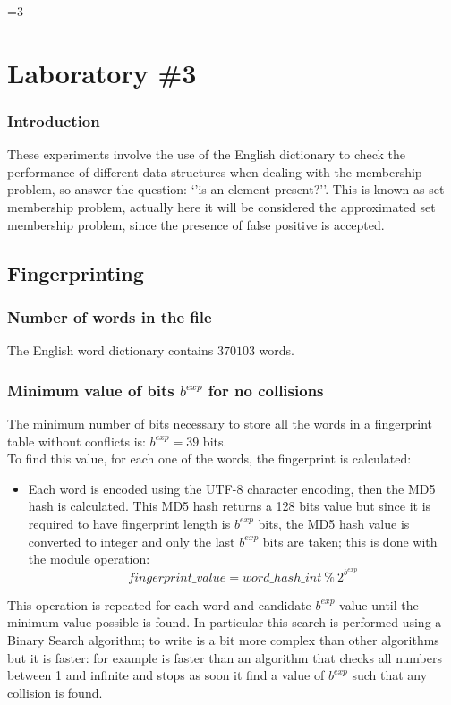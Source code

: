 \documentclass[twocolumn,letterpaper]{report}
\newcounter{debug}
\begin{document}
			
			
\ifnum\value{debug}=3 {

\chapter{Laboratory \#3}
		\subsection*{Introduction} 
				These experiments involve the use of the English dictionary to check the performance of different data structures when dealing with the membership problem, so answer the question: `'is an element present?''. This is known as set membership problem, actually here it will be considered the approximated set membership problem, since the presence of false positive is accepted.
	 
	 \section{Fingerprinting}	 
	 
			 	\subsection{Number of words in the file}
								The English word dictionary contains $370103$ words.
								
			 	\subsection{Minimum value of bits $b^{exp}$ for no collisions}
						The minimum number of bits necessary to store all the words in a fingerprint table without conflicts is: $b^{exp} = 39$ bits. \\
						To find this value, for each one of the words, the fingerprint is calculated:
						\begin{itemize}
								\item[] Each word is encoded using the UTF-8 character encoding, then the MD5 hash is calculated. This MD5 hash returns a 128 bits value but since it is required to have fingerprint length is $b^{exp}$ bits, the MD5 hash value is converted to integer and only the last  $b^{exp}$ bits are taken; this is done with the module operation: \[ fingerprint\_value = word\_hash\_int \: \% \: 2^{b^{exp}} \]
						\end{itemize}
						This operation is repeated for each word and candidate $b^{exp}$ value until the minimum value possible is found. In particular this search is performed using a Binary Search algorithm; to write is a bit more complex than other algorithms but it is faster: for example is faster than an algorithm that checks all numbers between 1 and infinite and stops as soon it find a value of $b^{exp}$ such that any collision is found.
						
}
\end{document}
